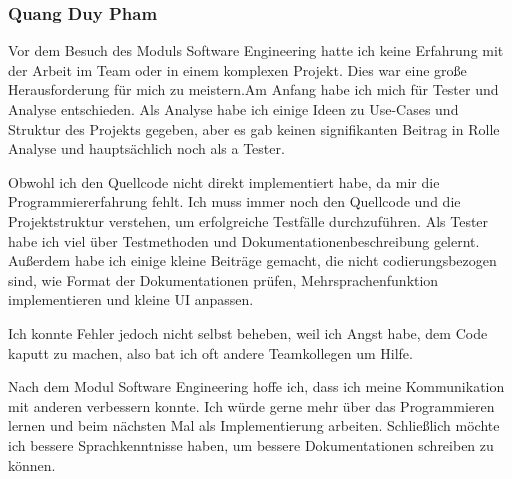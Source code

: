 \documentclass[10pt]{article}
\begin{document}
\subsubsection{Quang Duy Pham}
	Vor dem Besuch des Moduls Software Engineering hatte ich keine Erfahrung mit der Arbeit im Team oder in einem komplexen Projekt. Dies war eine große Herausforderung für mich zu meistern.Am Anfang habe ich mich für Tester und Analyse entschieden. Als Analyse habe ich einige Ideen zu Use-Cases und Struktur des Projekts gegeben, aber es gab keinen signifikanten Beitrag in Rolle Analyse und hauptsächlich noch als a Tester.\par
	Obwohl ich den Quellcode nicht direkt implementiert habe, da mir die Programmiererfahrung fehlt. Ich muss immer noch den Quellcode und die Projektstruktur verstehen, um erfolgreiche Testfälle durchzuführen. Als Tester habe ich viel über Testmethoden und Dokumentationenbeschreibung gelernt. Außerdem habe ich einige kleine Beiträge gemacht, die nicht codierungsbezogen sind, wie Format der Dokumentationen prüfen, Mehrsprachenfunktion implementieren und kleine UI anpassen.\par
	Ich konnte Fehler jedoch nicht selbst beheben, weil ich Angst habe, dem Code kaputt zu machen, also bat ich oft andere Teamkollegen um Hilfe.\par
	Nach dem Modul Software Engineering hoffe ich, dass ich meine Kommunikation mit anderen verbessern konnte. Ich würde gerne mehr über das Programmieren lernen und beim nächsten Mal als Implementierung arbeiten. Schließlich möchte ich bessere Sprachkenntnisse haben, um bessere Dokumentationen schreiben zu können.\par
\end{document}

